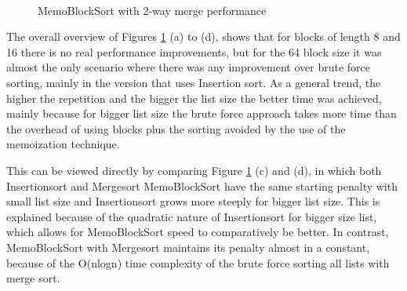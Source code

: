 \documentclass[a4paper,12pt]{article}
\begin{document}
\begin{figure}[H]
\\ %
%
\hfill %
%
\caption{MemoBlockSort with 2-way merge performance}
\label{fig:MemoBlockSort2WayGraph}
\end{figure}

The overall overview of Figures \ref{fig:MemoBlockSort2WayGraph} (a) to (d), shows that for blocks of length 8 and 16 there is no real performance improvements, but for the 64 block size it was almost the only scenario where there was any improvement over brute force sorting, mainly in the version that uses Insertion sort. 
As a general trend, the higher the repetition and the bigger the list size the better time was achieved, mainly because for bigger list size the brute force approach takes more time than the overhead of using blocks plus the sorting avoided by the use of the memoization technique.

This can be viewed directly by comparing Figure \ref{fig:MemoBlockSort2WayGraph} (c) and (d), in which both Insertionsort and Mergesort MemoBlockSort have the same starting penalty with small list size and Insertionsort grows more steeply for bigger list size. This is explained because of the quadratic nature of Insertionsort for bigger size list, which allows for MemoBlockSort speed to comparatively be better. In contrast, MemoBlockSort with Mergesort maintains its penalty almost in a constant, because of the O(nlogn) time complexity of the brute force sorting all lists with merge sort.\\
\end{document}
